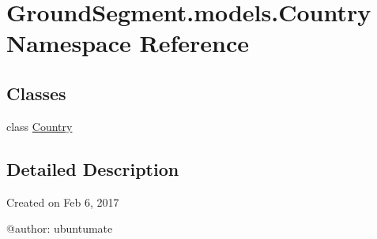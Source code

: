 \hypertarget{namespace_ground_segment_1_1models_1_1_country}{}\section{Ground\+Segment.\+models.\+Country Namespace Reference}
\label{namespace_ground_segment_1_1models_1_1_country}
\subsection*{Classes}
\begin{DoxyCompactItemize}
\item 
class \hyperlink{class_ground_segment_1_1models_1_1_country_1_1_country}{Country}
\end{DoxyCompactItemize}


\subsection{Detailed Description}
\begin{DoxyVerb}Created on Feb 6, 2017

@author: ubuntumate
\end{DoxyVerb}
 